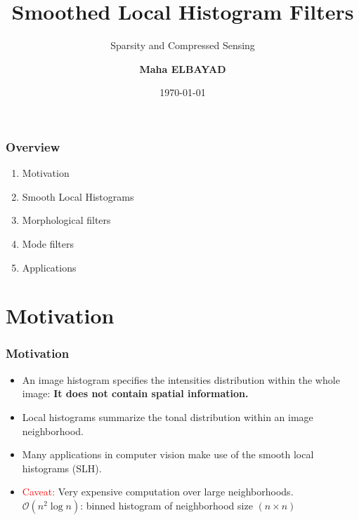 \documentclass [10 pt, xcolor=pdftex,x11names,table]{beamer}
\title{\sc \bf Smoothed Local Histogram Filters}
\subtitle{Sparsity and Compressed Sensing}
\author{\bf Maha ELBAYAD}
\institute[MVA|ECP]{\large{Ecole CentraleSupelec | ENS Cachan (M2 MVA)} }
\date{\today}
\begin{document}
\begin{frame}
    \titlepage
\end{frame}
\begin{frame}[label=Overview]
    \frametitle{Overview}
    \begin{enumerate}
    \item Motivation
    \item Smooth Local Histograms
    \item Morphological filters
    \item Mode filters
    \item Applications
    \end{enumerate}   
\end{frame}

\section{Motivation}    
\begin{frame}[label=Motivation]
    \frametitle{Motivation}
\begin{itemize}
\item An image histogram specifies the intensities distribution within the whole image: \textbf{It does not contain spatial information.}

\item Local histograms summarize the tonal distribution within an image neighborhood.

\item Many applications in computer vision make use of the smooth local histograms (SLH).

\item \textcolor{red}{Caveat:} Very expensive computation over large neighborhoods.\\$\mathcal O(n^2\log n)$: binned histogram of neighborhood size $(n\times n)$
\end{itemize}
\end{frame}
\end{document}
